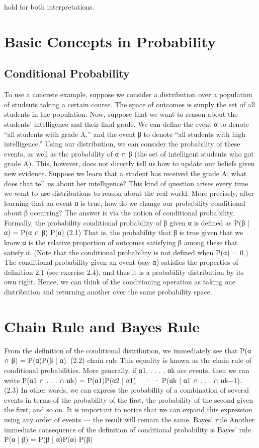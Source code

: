 hold for both interpretations.

\section{Basic Concepts in Probability}

\subsection{Conditional Probability}

To use a concrete example, suppose we consider a distribution over a population of students taking a certain course. The space of outcomes is simply the set of all students in the population. Now, suppose that we want to reason about the students’ intelligence and their final grade. We can define the event α to denote “all students with grade A,” and the event β to denote “all students with high intelligence.” Using our distribution, we can consider the probability of these events, as well as the probability of α ∩ β (the set of intelligent students who got grade A). This, however, does not directly tell us how to update our beliefs given new evidence. Suppose we learn that a student has received the grade A; what does that tell us about her intelligence? This kind of question arises every time we want to use distributions to reason about the real world. More precisely, after learning that an event α is true, how do we change our probability conditional about β occurring? The answer is via the notion of conditional probability. Formally, the probability conditional probability of β given α is defined as P(β | α) = P(α ∩ β) P(α) (2.1) That is, the probability that β is true given that we know α is the relative proportion of outcomes satisfying β among these that satisfy α. (Note that the conditional probability is not defined when P(α) = 0.) The conditional probability given an event (say α) satisfies the properties of definition 2.1 (see exercise 2.4), and thus it is a probability distribution by its own right. Hence, we can think of the conditioning operation as taking one distribution and returning another over the same probability space.

\section{Chain Rule and Bayes Rule}

From the definition of the conditional distribution, we immediately see that P(α ∩ β) = P(α)P(β | α). (2.2) chain rule This equality is known as the chain rule of conditional probabilities. More generally, if α1, . . . , αk are events, then we can write P(α1 ∩ . . . ∩ αk) = P(α1)P(α2 | α1) · · · P(αk | α1 ∩ . . . ∩ αk−1). (2.3) In other words, we can express the probability of a combination of several events in terms of the probability of the first, the probability of the second given the first, and so on. It is important to notice that we can expand this expression using any order of events — the result will remain the same. Bayes’ rule Another immediate consequence of the definition of conditional probability is Bayes’ rule P(α | β) = P(β | α)P(α) P(β)

